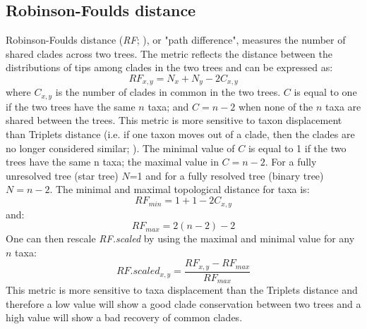 
\subsection{Robinson-Foulds distance}
Robinson-Foulds distance (\textit{RF}; \citealp{RF1981}), or "path difference", measures the number of shared clades across two trees. The metric reflects the distance between the distributions of tips among clades in the two trees \citep{RF1981} and can be expressed as:
\begin{equation}
RF_{x,y} = N_{x} + N_{y} - 2C_{x,y}
\end{equation}
where $C_{x,y}$ is the number of clades in common in the two trees. $C$ is equal to one if the two trees have the same $n$ taxa; and $C = n-2$ when none of the $n$ taxa are shared between the trees. This metric is more sensitive to taxon displacement than Triplets distance (i.e. if one taxon moves out of a clade, then the clades are no longer considered similar; \citet{critchlowthe1996,johnson1998,wiensmissing2003}). The minimal value of $C$ is equal to 1 if the two trees have the same n taxa; the maximal value in $C = n-2$. For a fully unresolved tree (star tree) $N$=1 and for a fully resolved tree (binary tree) $N = n-2$. The minimal and maximal topological distance for taxa is:
\begin{equation}
RF_{min} = 1 + 1 - 2C_{x,y}
\end{equation}
and:
\begin{equation}
RF_{max} = 2(n-2)-2
\end{equation}
One can then rescale \textit{RF.scaled} by using the maximal and minimal value for any $n$ taxa:
\begin{equation}
RF.scaled_{x,y} = \frac{RF_{x,y}-RF_{max}}{RF_{max}}
\end{equation}
This metric is more sensitive to taxa displacement than the Triplets distance \citep{critchlowthe1996,johnson1998,wiensmissing2003} and therefore a low value will show a good clade conservation between two trees and a high value will show a bad recovery of common clades.

